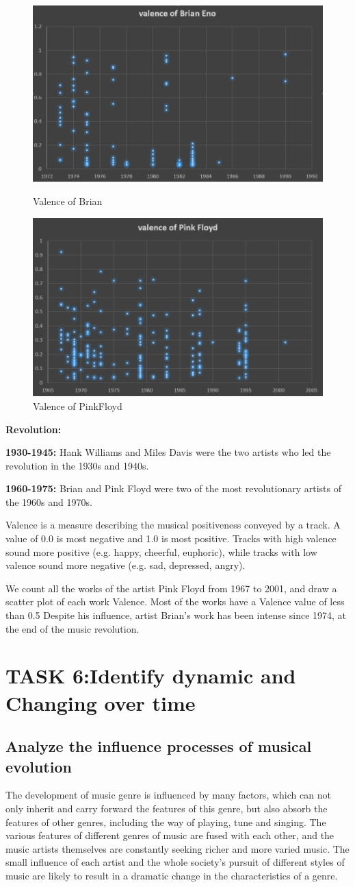 \documentclass[conference]{IEEEtran}
\begin{document}
\begin{figure}[htbp]
	\begin{minipage}[t]{0.5\textwidth}
		\centering
		\includegraphics[width=.3\textwidth]{./img/valence_of_Brian}
		\caption{Valence of Brian\label{fig:valence_of_Brian}}
	\end{minipage}
	\qquad
	\begin{minipage}[t]{0.5\textwidth}
		\centering
		\includegraphics[width=.3\textwidth]{./img/valence_of_PinkFloyd}
		\caption{Valence of PinkFloyd\label{fig:valence_of_PinkFloyd}}
	\end{minipage}
\end{figure}
\textbf{Revolution:}

\textbf{1930-1945:} Hank Williams and Miles Davis were the two artists who led the revolution in the 1930s and 1940s.

\textbf{1960-1975:} Brian and Pink Floyd were two of the most revolutionary artists of the 1960s and 1970s.

Valence is a measure describing the musical positiveness conveyed by a track. A value of 0.0 is most negative and 1.0 is most positive. Tracks with high valence sound more positive (e.g. happy, cheerful, euphoric), while tracks with low valence sound more negative (e.g. sad, depressed, angry).

We count all the works of the artist Pink Floyd from 1967 to 2001, and draw a scatter plot of each work Valence. Most of the works have a Valence value of less than 0.5 Despite his influence, artist Brian’s work has been intense since 1974, at the end of the music revolution.
\section{TASK 6:Identify dynamic and Changing over time}
\subsection{Analyze the influence processes of musical evolution}
The development of music genre is influenced by many factors, which can not only inherit and carry forward the features of this genre, but also absorb the features of other genres, including the way of playing, tune and singing. The various features of different genres of music are fused with each other, and the music artists themselves are constantly seeking richer and more varied music. The small influence of each artist and the whole society’s pursuit of different styles of music are likely to result in a dramatic change in the characteristics of a genre.
\end{document}
